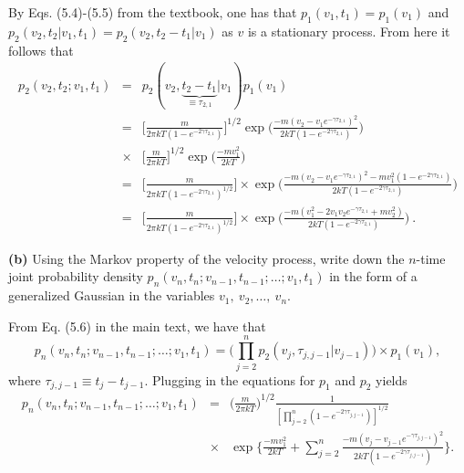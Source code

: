 By Eqs. (5.4)-(5.5) from the textbook, one has that $p_1(v_1, t_1)=p_1(v_1)$ and $p_2(v_2, t_2 | v_1, t_1) = p_2(v_2, t_2-t_1 | v_1)$ as $v$ is a stationary process. From here it follows that
\begin{eqnarray}
p_2(v_2,t_2;v_1,t_1) &=& p_2(v_2, \underbrace{t_2-t_1}_{\equiv\tau_{2,1}} | v_1) p_1(v_1) \nonumber \\
&=& \bigg[\frac{m}{2\pi k T (1-e^{-2\gamma \tau_{2,1}})}\bigg]^{1/2} \exp\bigg(\frac{-m(v_2-v_1 e^{-\gamma \tau_{2,1}})^2}{2 k T (1-e^{-2\gamma \tau_{2,1}})}\bigg) \nonumber \\
&\times& \bigg[\frac{m}{2\pi k T}\bigg]^{1/2} \exp\bigg(\frac{-mv_1^2}{2 k T}\bigg) \nonumber \\
&=& \bigg[\frac{m}{2\pi k T (1-e^{-2\gamma \tau_{2,1}})^{1/2}}\bigg] \times \exp\bigg(\frac{-m(v_2-v_1 e^{-\gamma \tau_{2,1}})^2 -m v_1^2 (1-e^{-2\gamma \tau_{2,1}})}{2 k T (1-e^{-2\gamma \tau_{2,1}})} \bigg) \nonumber \\
&=& \boxed{\bigg[\frac{m}{2\pi k T (1-e^{-2\gamma \tau_{2,1}})^{1/2}}\bigg] \times \exp\bigg(\frac{-m(v_1^2-2 v_1 v_2 e^{-\gamma \tau_{2,1}} + m v_2^2)}{2 k T (1-e^{-2\gamma \tau_{2,1}})} \bigg)}~.  \label{eq:2_time_joint_probability}
\end{eqnarray}

\textbf{(b)} Using the Markov property of the velocity process, write down the $n$-time joint probability density $p_n(v_n,t_n;v_{n-1},t_{n-1};\ldots ; v_1, t_1)$ in the form of a generalized Gaussian in the variables $v_1,~v_2, \ldots,~ v_n$.

From Eq. (5.6) in the main text, we have that
\begin{equation}
p_n(v_n,t_n;v_{n-1},t_{n-1};\ldots ; v_1, t_1) = \bigg( \prod_{j=2}^{n} p_2(v_j, \tau_{j,j-1}|v_{j-1}) \bigg) \times p_1(v_1),
\end{equation}
where $\tau_{j,j-1} \equiv t_{j}-t_{j-1}$. Plugging in the equations for $p_1$ and $p_2$ yields
\begin{eqnarray}
p_n(v_n,t_n;v_{n-1},t_{n-1};\ldots ; v_1, t_1) &=& \bigg(\frac{m}{2 \pi k T}\bigg)^{1/2} \frac{1}{[\prod_{j=2}^{n} (1-e^{-2\gamma \tau_{j,j-1}})]^{1/2}} \nonumber \\
&\times& \exp\bigg\{ \frac{-m v_1^2}{2kT}+\sum_{j=2}^{n} \frac{-m(v_j-v_{j-1} e^{-\gamma \tau_{j,j-1}})^2}{2 k T (1-e^{-2 \gamma \tau_{j,j-1}})}\bigg\}. \label{eq:n_time_joint_probability}
\end{eqnarray}


